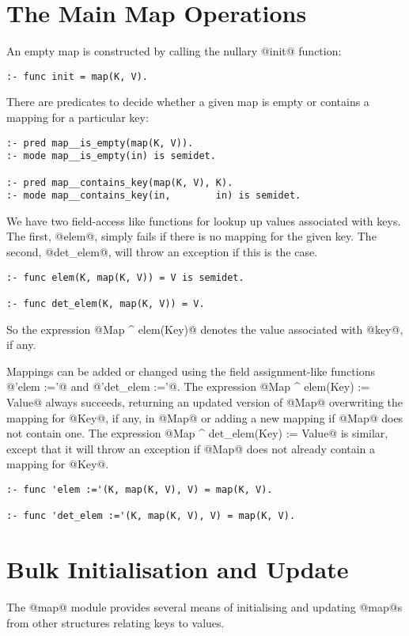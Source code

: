 \section{The Main Map Operations}

An empty map is constructed by calling the nullary @init@ function:
\begin{verbatim}
:- func init = map(K, V).
\end{verbatim}
There are predicates to decide whether a given map is empty or
contains a mapping for a particular key:
\begin{verbatim}
:- pred map__is_empty(map(K, V)).
:- mode map__is_empty(in) is semidet.

:- pred map__contains_key(map(K, V), K).
:- mode map__contains_key(in,        in) is semidet.
\end{verbatim}
We have two field-access like functions for lookup up values
associated with keys.  The first, @elem@, simply fails if there
is no mapping for the given key.  The second, @det_elem@, will
throw an exception if this is the case.
\begin{verbatim}
:- func elem(K, map(K, V)) = V is semidet.

:- func det_elem(K, map(K, V)) = V.
\end{verbatim}
So the expression @Map ^ elem(Key)@ denotes the value associated
with @key@, if any.

Mappings can be added or changed using the field assignment-like
functions @'elem :='@ and @'det_elem :='@.  The expression
@Map ^ elem(Key) := Value@ always succeeds, returning an updated
version of @Map@ overwriting the mapping for @Key@, if any, in @Map@
or adding a new mapping if @Map@ does not contain one.  The expression
@Map ^ det_elem(Key) := Value@ is similar, except that it will throw
an exception if @Map@ does not already contain a mapping for @Key@.
\begin{verbatim}
:- func 'elem :='(K, map(K, V), V) = map(K, V).

:- func 'det_elem :='(K, map(K, V), V) = map(K, V).
\end{verbatim}

\section{Bulk Initialisation and Update}

The @map@ module provides several means of initialising and updating
@map@s from other structures relating keys to values.


